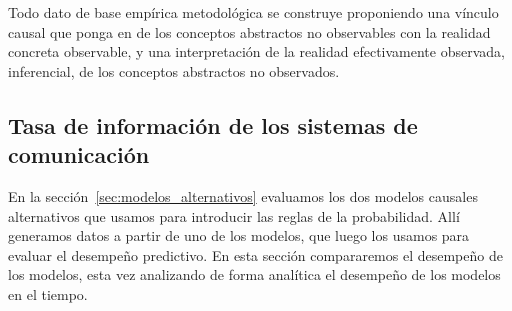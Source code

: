 \documentclass[a4paper,11pt]{book}
\theoremstyle{definition}
\begin{document}

Todo dato de base empírica metodológica se construye proponiendo una vínculo causal que ponga en de los conceptos abstractos no observables con la realidad concreta observable, y una interpretación de la realidad efectivamente observada, inferencial, de los conceptos abstractos no observados.

\subsection{Tasa de información de los sistemas de comunicación} \label{sec:tasa_de_informacion}

En la sección~\ref{sec:modelos_alternativos} evaluamos los dos modelos causales alternativos que usamos para introducir las reglas de la probabilidad.
%
Allí generamos datos a partir de uno de los modelos, que luego los usamos para evaluar el desempeño predictivo.
%
En esta sección compararemos el desempeño de los modelos, esta vez analizando de forma analítica el desempeño de los modelos en el tiempo.

\end{document}
